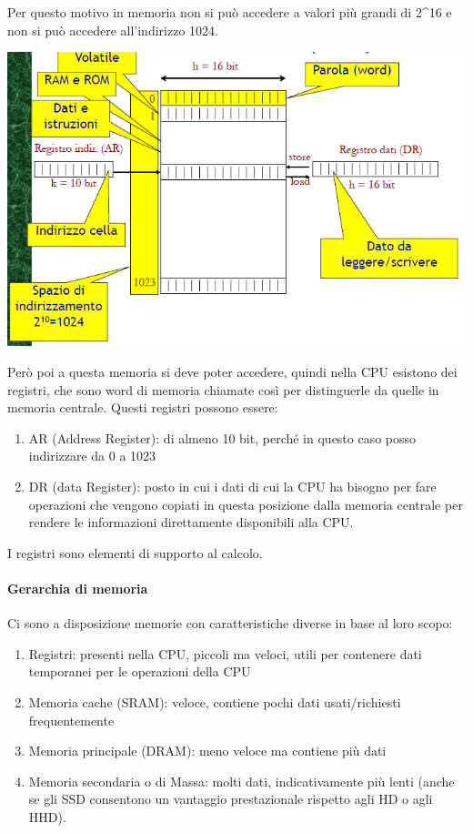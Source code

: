 \documentclass[
  paper=a4,
  oneside  ,captions=tableheading
]{scrbook}
\providecommand{\tightlist}{%
  \setlength{\itemsep}{0pt}\setlength{\parskip}{0pt}}
\begin{document}
Per questo motivo in memoria non si può accedere a valori più grandi di
2\^{}16 e non si può accedere all'indirizzo 1024.

\includegraphics{./image/image-20201111185631084.png}

Però poi a questa memoria si deve poter accedere, quindi nella CPU
esistono dei registri, che sono word di memoria chiamate così per
distinguerle da quelle in memoria centrale. Questi registri possono
essere:

\begin{enumerate}
\def\labelenumi{\arabic{enumi}.}
\tightlist
\item
  AR (Address Register): di almeno 10 bit, perché in questo caso posso
  indirizzare da 0 a 1023
\item
  DR (data Register): posto in cui i dati di cui la CPU ha bisogno per
  fare operazioni che vengono copiati in questa posizione dalla memoria
  centrale per rendere le informazioni direttamente disponibili alla
  CPU.
\end{enumerate}

I registri sono elementi di supporto al calcolo.

\hypertarget{gerarchia-di-memoria}{%
\paragraph{Gerarchia di memoria}\label{gerarchia-di-memoria}}

Ci sono a disposizione memorie con caratteristiche diverse in base al
loro scopo:

\begin{enumerate}
\def\labelenumi{\arabic{enumi}.}
\tightlist
\item
  Registri: presenti nella CPU, piccoli ma veloci, utili per contenere
  dati temporanei per le operazioni della CPU
\item
  Memoria cache (SRAM): veloce, contiene pochi dati usati/richiesti
  frequentemente
\item
  Memoria principale (DRAM): meno veloce ma contiene più dati
\item
  Memoria secondaria o di Massa: molti dati, indicativamente più lenti
  (anche se gli SSD consentono un vantaggio prestazionale rispetto agli
  HD o agli HHD).
\end{enumerate}
\end{document}
